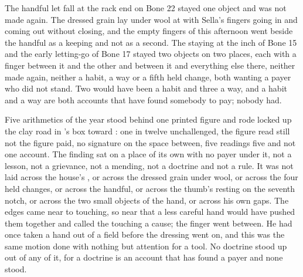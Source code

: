 The handful let fall at the rack end on Bone 22 stayed one object and was not made again. The dressed grain lay under wool at  with Sella's fingers going in and coming out without closing, and the empty fingers of this afternoon went beside the handful as a keeping and not as a second. The staying at the inch of Bone 15 and the early letting-go of Bone 17 stayed two objects on two places, each with a finger between it and the other and between it and everything else there, neither made again, neither a habit, a way or a fifth held change, both wanting a payer who did not stand. Two would have been a habit and three a way, and a habit and a way are both accounts that have found somebody to pay; nobody had.

Five arithmetics of the year stood behind one printed figure and rode locked up the clay road in 's box toward : one in twelve unchallenged, the figure read still not the figure paid, no signature on the space between, five readings five and not one account. The finding sat on a place of its own with no payer under it, not a lesson, not a grievance, not a mending, not a doctrine and not a rule. It was not laid across the house's , or across the dressed grain under wool, or across the four held changes, or across the handful, or across the thumb's resting on the seventh notch, or across the two small objects of the hand, or across his own gaps. The edges came near to touching, so near that a less careful hand would have pushed them together and called the touching a cause; the finger went between. He had once taken a hand out of a field before the dressing went on, and this was the same motion done with nothing but attention for a tool. No doctrine stood up out of any of it, for a doctrine is an account that has found a payer and none stood.

\scenebreak

